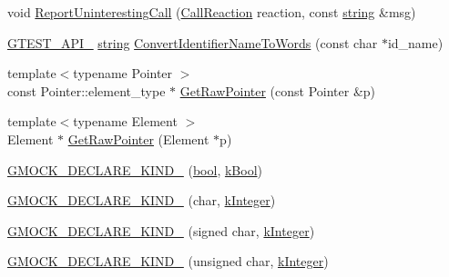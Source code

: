 \begin{DoxyCompactItemize}
\item 
void \hyperlink{namespacetesting_1_1internal_a8d99a1e87d0cea563b2bfad8a4e65276}{Report\+Uninteresting\+Call} (\hyperlink{namespacetesting_1_1internal_adfcd859062983a889f4bd18e6977357e}{Call\+Reaction} reaction, const \hyperlink{namespacetesting_1_1internal_a8e8ff5b11e64078831112677156cb111}{string} \&msg)
\item 
\hyperlink{gtest-port_8h_aa73be6f0ba4a7456180a94904ce17790}{G\+T\+E\+S\+T\+\_\+\+A\+P\+I\+\_\+} \hyperlink{namespacetesting_1_1internal_a8e8ff5b11e64078831112677156cb111}{string} \hyperlink{namespacetesting_1_1internal_a571db854f6de337007c53573c9cbf8a3}{Convert\+Identifier\+Name\+To\+Words} (const char $\ast$id\+\_\+name)
\item 
{\footnotesize template$<$typename Pointer $>$ }\\const Pointer\+::element\+\_\+type $\ast$ \hyperlink{namespacetesting_1_1internal_ae88d1a6f95165c43c27a6c0e2d357e61}{Get\+Raw\+Pointer} (const Pointer \&p)
\item 
{\footnotesize template$<$typename Element $>$ }\\Element $\ast$ \hyperlink{namespacetesting_1_1internal_a4d17b114b61b805ac5f37e9c26e29e55}{Get\+Raw\+Pointer} (Element $\ast$p)
\item 
\hyperlink{namespacetesting_1_1internal_a20f5584732e44a368e7acf295b639319}{G\+M\+O\+C\+K\+\_\+\+D\+E\+C\+L\+A\+R\+E\+\_\+\+K\+I\+N\+D\+\_\+} (\hyperlink{classbool}{bool}, \hyperlink{namespacetesting_1_1internal_aa8747bda20137c9aa7f846dee830e686a3af2191917fb1796599139b3615302fe}{k\+Bool})
\item 
\hyperlink{namespacetesting_1_1internal_ac8f3722ca21d8b14f86e5c949e843508}{G\+M\+O\+C\+K\+\_\+\+D\+E\+C\+L\+A\+R\+E\+\_\+\+K\+I\+N\+D\+\_\+} (char, \hyperlink{namespacetesting_1_1internal_aa8747bda20137c9aa7f846dee830e686a8a52f0fd73e05da35c45d80653633cab}{k\+Integer})
\item 
\hyperlink{namespacetesting_1_1internal_ae5b8e77d245fd0838ab22e439e92e9af}{G\+M\+O\+C\+K\+\_\+\+D\+E\+C\+L\+A\+R\+E\+\_\+\+K\+I\+N\+D\+\_\+} (signed char, \hyperlink{namespacetesting_1_1internal_aa8747bda20137c9aa7f846dee830e686a8a52f0fd73e05da35c45d80653633cab}{k\+Integer})
\item 
\hyperlink{namespacetesting_1_1internal_ab13e89be2f0f22b1da9e22cd53bce5ce}{G\+M\+O\+C\+K\+\_\+\+D\+E\+C\+L\+A\+R\+E\+\_\+\+K\+I\+N\+D\+\_\+} (unsigned char, \hyperlink{namespacetesting_1_1internal_aa8747bda20137c9aa7f846dee830e686a8a52f0fd73e05da35c45d80653633cab}{k\+Integer})
\item 

\end{DoxyCompactItemize}
